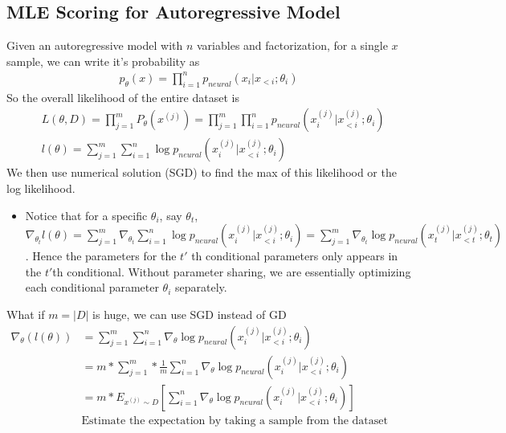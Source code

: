 \subsection{MLE Scoring for Autoregressive Model}
Given an autoregressive model with $n$ variables and factorization, for a single $x$ sample, we can write it's probability as  
    \begin{align*}
        p_\theta(x) = \prod_{i=1}^{n} p_{neural}(x_i | x_{<i} ; \theta_i)
    \end{align*}
So the overall likelihood of the entire dataset is 
    \begin{align*}
        & L(\theta, D) = \prod_{j=1}^{m} P_\theta(x^{(j)}) = \prod_{j=1}^{m} \prod_{i=1}^{n} p_{neural}(x^{(j)}_i | x^{(j)}_{<i} ; \theta_i) \\
        & l(\theta) = \sum_{j=1}^{m} \sum_{i=1}^{n} \log p_{neural}(x^{(j)}_i | x^{(j)}_{<i} ; \theta_i)
    \end{align*}
We then use numerical solution (SGD) to find the max of this likelihood or the log likelihood. 
    \begin{itemize}
        \item Notice that for a specific $\theta_i$, say $\theta_t$, $\nabla_{\theta_t}l(\theta) = \sum_{j=1}^m \nabla_{\theta_t}\sum_{i=1}^{n} \log p_{neural}(x^{(j)}_i | x^{(j)}_{<i} ; \theta_i) = \sum_{j=1}^m \nabla_{\theta_t} \log p_{neural}(x^{(j)}_t | x^{(j)}_{<t} ; \theta_t)$. Hence the parameters for the $t'$ th conditional parameters only appears in the $t'$th conditional. Without parameter sharing, we are essentially optimizing each conditional parameter $\theta_i$ separately. 
    \end{itemize}
What if $m = |D|$ is huge, we can use SGD instead of GD
    \begin{align*}
        \nabla_\theta(l(\theta)) 
        &=  \sum_{j=1}^{m} \sum_{i=1}^{n} \nabla_\theta \log p_{neural}(x^{(j)}_i | x^{(j)}_{<i} ; \theta_i)\\
        &= m * \sum_{j=1}^{m} * \frac{1}{m} \sum_{i=1}^{n} \nabla_\theta \log p_{neural}(x^{(j)}_i | x^{(j)}_{<i} ; \theta_i)\\
        &= m * E_{x^{(j)} \sim D} \left[ \sum_{i=1}^{n} \nabla_\theta \log p_{neural}(x^{(j)}_i | x^{(j)}_{<i} ; \theta_i)  \right]\\
        & \textrm{Estimate the expectation by taking a sample from the dataset and evaluate the gradient}
    \end{align*}


